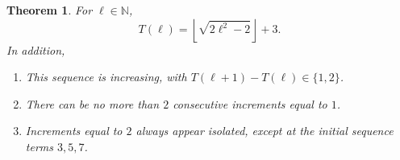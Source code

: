 \documentclass[12pt, a4paper]{article}
\newcommand{\funti}{T} %
\newcommand{\leni}{\ell} %
\newtheorem{theorem}{Theorem}%
\begin{document}
\begin{theorem}
\label{theo: funti}
For $\leni \in \mathbb N$,
\begin{equation}
\label{eq: funti leni}
\funti(\leni) = \left\lfloor \sqrt{2\leni^2-2} \right\rfloor + 3.
\end{equation}
In addition,
\begin{enumerate}
\item
This sequence is increasing, with $\funti(\leni+1)-\funti(\leni) \in \{1, 2\}$.
\item
There can be no more than $2$ consecutive increments equal to $1$.
\item
Increments equal to $2$ always appear isolated, except at the initial sequence terms $3, 5, 7$.
\end{enumerate}
\end{theorem}
\end{document}
